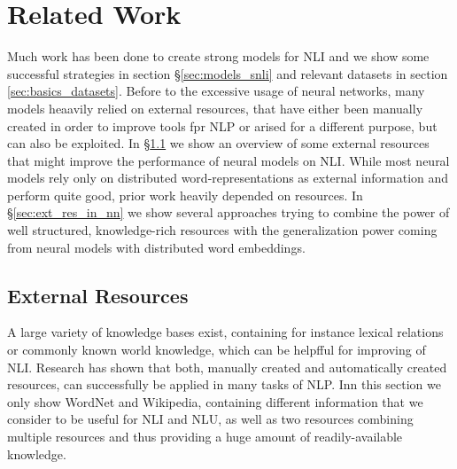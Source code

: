 \section{Related Work}\label{sec:related_work}
Much work has been done to create strong models for \ac{NLI} and we show some successful strategies in section §\ref{sec:models_snli} and relevant datasets in section \ref{sec:basics_datasets}. Before to the excessive usage of neural networks, many models heaavily relied on external resources, that have either been manually created in order to improve tools fpr \ac{NLP} or arised for a different purpose, but can also be exploited. In §\ref{sec:ext_resources} we show an overview of some external resources that might improve the performance of neural models on \ac{NLI}. While most neural models rely only on distributed word-representations as external information and perform quite good, prior work \citep{bos2005recognising,tatu2005semantic} heavily depended on resources. In §\ref{sec:ext_res_in_nn} we show several approaches trying to combine the power of well structured, knowledge-rich resources with the generalization power coming from neural models with distributed word embeddings.
\subsection{External Resources}\label{sec:ext_resources}
A large variety of knowledge bases exist, containing for instance lexical relations or commonly known world knowledge, which can be helpfful for improving of \ac{NLI}. Research has shown that both, manually created and automatically created resources, can successfully be applied in many tasks of \ac{NLP}. Inn this section we only show WordNet and Wikipedia, containing different information that we consider to be useful for \ac{NLI} and \ac{NLU}, as well as two resources combining multiple resources and thus providing a huge amount of readily-available knowledge.

